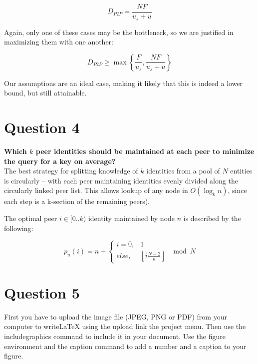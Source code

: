 \documentclass[a4paper]{article}
\begin{document}
$$D_{P2P} = \frac{NF}{u_s+u}$$

Again, only one of these cases may be the bottleneck, so we are justified in maximizing them with one another:

$$D_{P2P} \geq \max \left\{ \frac{F}{u_s}, \frac{NF}{u_s+u} \right\}$$

Our assumptions are an ideal case, making it likely that this is indeed a lower bound, but still attainable.


\section{Question 4}

\textbf{Which $k$ peer identities should be maintained at each peer to minimize the query for a key on average?} \\

The best strategy for splitting knowledge of $k$ identities from a pool of $N$ entities is circularly -- with each peer maintaining identities evenly divided along the circularly linked peer list. This allows lookup of any node in $O(\log_k{n})$, since each step is a k-section of the remaining peers).

The optimal peer $i \in [0..k)$ identity maintained by node $n$ is described by the following:

\[
p_n(i) = n + \begin{cases}
i = 0, & 1 \\
else, & \left \lfloor i \frac{N - 2}{k} \right \rfloor
\end{cases} \mod N
\]



\section{Question 5}


First you have to upload the image file (JPEG, PNG or PDF) from your computer to writeLaTeX using the upload link the project menu. Then use the includegraphics command to include it in your document. Use the figure environment and the caption command to add a number and a caption to your figure. 

\end{document}
